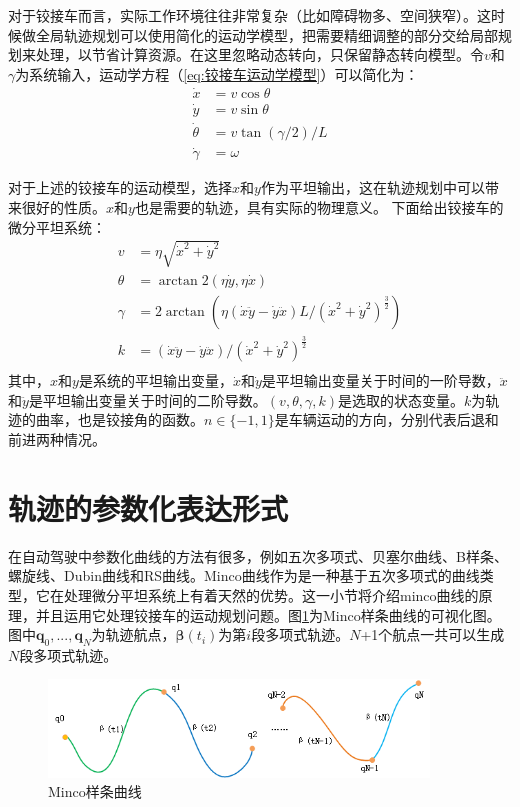 \documentclass[master,academic]{ysuthesis} %
\begin{document}
		对于铰接车而言，实际工作环境往往非常复杂（比如障碍物多、空间狭窄）。这时候做全局轨迹规划可以使用简化的运动学模型，把需要精细调整的部分交给局部规划来处理，以节省计算资源。在这里忽略动态转向，只保留静态转向模型。令$v$和$\gamma$为系统输入，运动学方程（\ref{eq:铰接车运动学模型}）可以简化为：
		\begin{equation}
			\begin{aligned}
				\dot{x} &= v\cos\theta\\
				\dot{y} &= v\sin\theta\\
				\dot{\theta} &= v\tan( \gamma /2 ) /L\\
				\dot{\gamma} &= \omega
			\end{aligned}
		\end{equation} 

		对于上述的铰接车的运动模型，选择$x$和$y$作为平坦输出，这在轨迹规划中可以带来很好的性质。$x$和$y$也是需要的轨迹，具有实际的物理意义。
		下面给出铰接车的微分平坦系统：
		\begin{equation}
			\begin{aligned}
				v&=\eta \sqrt{\dot{x}^2+\dot{y}^2}\\
				\theta &=\arctan2( \eta \dot{y},\eta \dot{x} ) \\
				\gamma &=2\arctan( \eta ( \dot{x}\ddot{y}-\dot{y}\ddot{x} ) L/( \dot{x}^2+\dot{y}^2 ) ^{\frac{3}{2}} ) \\
				k&=( \dot{x}\ddot{y}-\dot{y}\ddot{x} ) /( \dot{x}^2+\dot{y}^2 ) ^{\frac{3}{2}}\\
			\end{aligned}
		\end{equation}
	其中，$x$和$y$是系统的平坦输出变量，$\dot{x}$和$\dot{y}$是平坦输出变量关于时间的一阶导数，$\ddot{x}$和$\ddot{y}$是平坦输出变量关于时间的二阶导数。$(v,\theta,\gamma,k)$是选取的状态变量。$k$为轨迹的曲率，也是铰接角的函数。$n\in\{-1,1\}$是车辆运动的方向，分别代表后退和前进两种情况。

	\newpage
	\vspace*{-1.5em}

	\section{轨迹的参数化表达形式}
	在自动驾驶中参数化曲线的方法有很多，例如五次多项式、贝塞尔曲线、B样条、螺旋线、Dubin曲线和RS曲线。Minco曲线作为是一种基于五次多项式的曲线类型，它在处理微分平坦系统上有着天然的优势。这一小节将介绍minco曲线的原理，并且运用它处理铰接车的运动规划问题。图\ref{fig:minco}为Minco样条曲线的可视化图。图中$\bm{q}_{0},...,\bm{q}_{N}$为轨迹航点，$\bm{\beta}(t_i)$为第$i$段多项式轨迹。$N$+1个航点一共可以生成$N$段多项式轨迹。
	\begin{figure}[H]
		\centering
		\includegraphics[width=0.9\textwidth]{minco.png}
		\caption{Minco样条曲线}
		\label{fig:minco}
	\end{figure}
\end{document}
